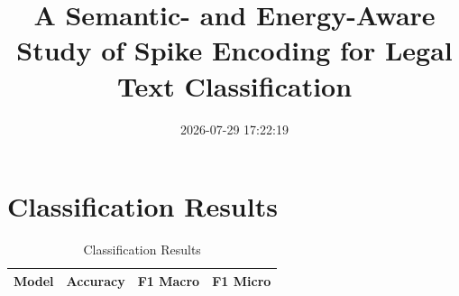 \documentclass[12pt]{article}
\title{A Semantic- and Energy-Aware Study of Spike Encoding for Legal Text Classification}
\date{2026-07-29 17:22:19}
\begin{document}
\maketitle
\section{Classification Results}
\begin{table}[h]\centering
\begin{tabular}{lccc}\toprule
Model & Accuracy & F1 Macro & F1 Micro \\\midrule
\bottomrule\end{tabular}
\caption{Classification Results}
\end{table}
\end{document}
